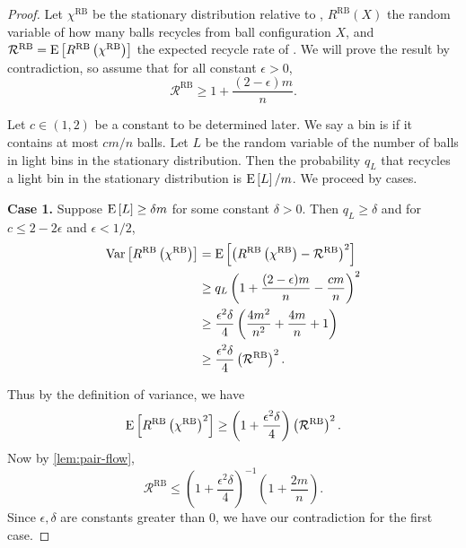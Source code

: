 \begin{proof}
	Let $\chi^\textrm{RB}$ be the stationary distribution relative to \RB,
	$R^\textrm{RB}(X)$ the random variable of how many balls \RB recycles from
	ball configuration $X$, and $\mathcal{R}^\textrm{RB} =
	\mathrm{E}\left[R^\textrm{RB}\left(\chi^\textrm{RB}\right)\right]$ the expected recycle rate
	of \RB.  We will prove the result by contradiction, so assume that for all 
	constant $\epsilon > 0$,
	\[\mathcal{R}^\textrm{RB} \geq 1 + \frac{(2-\epsilon)m}{n}.\]

	Let $c\in(1,2)$ be a constant to be determined later. We say a bin is
	 if it contains at most $cm/n$ balls. Let $L$ be the random
	variable of the number of balls in light bins in the stationary
	distribution. Then the probability $q_L$ that \RB recycles a light bin in
	the stationary distribution is $\mathrm{E}\left[L\right]/m$. We proceed by cases.

{\bf Case 1.} Suppose $\mathrm{E}\left[L\right] \geq \delta m$ for some constant $\delta > 0$. Then $q_L \geq \delta$ and for $c \leq 2 - 2\epsilon$ and $\epsilon < 1/2$,
\begin{align*}
	\mathrm{Var}\left[R^\textrm{RB}\left(\chi^\textrm{RB}\right)\right] 
	&= \mathrm{E}\left[\left(R^\textrm{RB}\left(\chi^\textrm{RB}\right) - \mathcal{R}^\textrm{RB}\right)^2\right]  \\
	&\ge q_L \left(1+\frac{(2-\epsilon)m}{n}-\frac{cm}{n}\right)^2 \\
	&\ge \frac{\epsilon^2\delta}{4} \left(\frac{4m^2}{n^2}+\frac{4m}{n}+1\right) \\
	&\ge \frac{\epsilon^2 \delta}{4} \left(\mathcal{R}^\textrm{RB}\right)^2. \label{eqn:varFl}
\end{align*}

Thus by the definition of variance, we have
\begin{equation*}
	\mathrm{E}\left[R^\textrm{RB}\left(\chi^\textrm{RB}\right)^2\right] \ge \left(1+\frac{\epsilon^2\delta}{4}\right)\left(\mathcal{R}^\textrm{RB}\right)^2. \label{eqn:expF2l}
\end{equation*}
	Now by \cref{lem:pair-flow},
\begin{equation*}
	\mathcal{R}^\textrm{RB} \le \left(1+\frac{\epsilon^2\delta}{4}\right)^{-1}\left(1+\frac{2m}{n}\right).
\end{equation*}
Since $\epsilon, \delta$ are constants greater than $0$, we have our contradiction for
	the first case. 


\end{proof}
